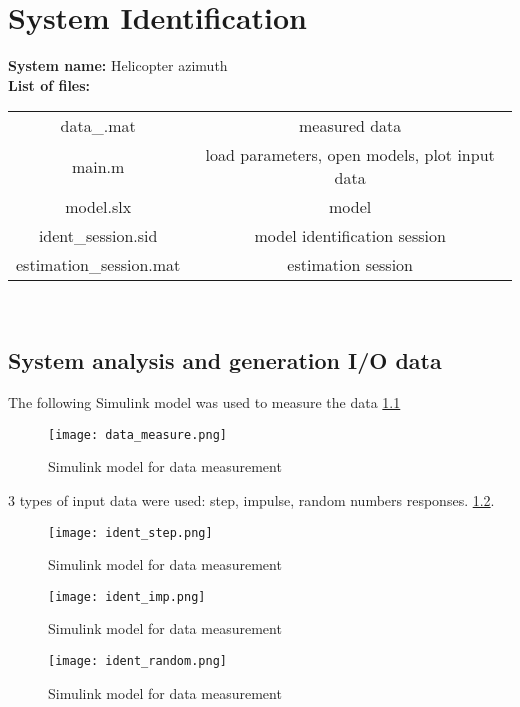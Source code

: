 \chapter{System Identification}

\textbf{System name:} Helicopter azimuth \\

\textbf{List of files:} 

\begin{tabular}{ |c|c| }
    \hline
    data\_\*.mat             & measured data \\
    main.m                  & load parameters, open models, plot input data \\
    model.slx               & model \\
    ident\_session.sid      & model identification session \\
    estimation\_session.mat & estimation session \\
    \hline
\end{tabular} \\

\section{System analysis and generation I/O data}\label{sec:data}

The following Simulink model was used to measure the data
\ref{fig:data_measure}

\begin{figure}[htb!]
    \centering
    \texttt{[image: data\_measure.png]}
    \caption{Simulink model for data measurement}
    \label{fig:data_measure}
\end{figure}

3 types of input data were used: step, impulse, random numbers responses.
\ref{fig:ident_data_1}.

\begin{figure}[htb!]
    \centering
    \texttt{[image: ident\_step.png]}
    \caption{Simulink model for data measurement}
    \label{fig:ident_data_1}
\end{figure}
\begin{figure}[htb!]
    \centering
    \texttt{[image: ident\_imp.png]}
    \caption{Simulink model for data measurement}
    \label{fig:ident_data_2}
\end{figure}
\begin{figure}[htb!]
    \centering
    \texttt{[image: ident\_random.png]}
    \caption{Simulink model for data measurement}
    \label{fig:ident_data_3}
\end{figure}

